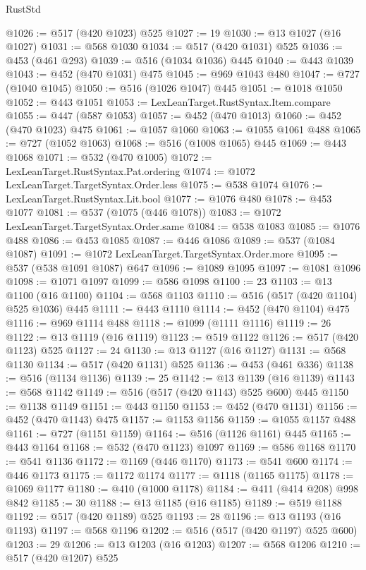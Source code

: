 \begin{lexlean}{RustStd}
\begin{coremodule}
@1026 := @517 (@420 @1023) @525
@1027 := 19
@1030 := @13 @1027 (@16 @1027)
@1031 := @568 @1030
@1034 := @517 (@420 @1031) @525
@1036 := @453 (@461 @293)
@1039 := @516 (@1034 @1036) @445
@1040 := @443 @1039
@1043 := @452 (@470 @1031) @475
@1045 := @969 @1043 @480
@1047 := @727 (@1040 @1045)
@1050 := @516 (@1026 @1047) @445
@1051 := @1018 @1050
@1052 := @443 @1051
@1053 := LexLeanTarget.RustSyntax.Item.compare
@1055 := @447 (@587 @1053)
@1057 := @452 (@470 @1013)
@1060 := @452 (@470 @1023) @475
@1061 := @1057 @1060
@1063 := @1055 @1061 @488
@1065 := @727 (@1052 @1063)
@1068 := @516 (@1008 @1065) @445
@1069 := @443 @1068
@1071 := @532 (@470 @1005)
@1072 := LexLeanTarget.RustSyntax.Pat.ordering
@1074 := @1072 LexLeanTarget.TargetSyntax.Order.less
@1075 := @538 @1074
@1076 := LexLeanTarget.RustSyntax.Lit.bool
@1077 := @1076 @480
@1078 := @453 @1077
@1081 := @537 (@1075 (@446 @1078))
@1083 := @1072 LexLeanTarget.TargetSyntax.Order.same
@1084 := @538 @1083
@1085 := @1076 @488
@1086 := @453 @1085
@1087 := @446 @1086
@1089 := @537 (@1084 @1087)
@1091 := @1072 LexLeanTarget.TargetSyntax.Order.more
@1095 := @537 (@538 @1091 @1087) @647
@1096 := @1089 @1095
@1097 := @1081 @1096
@1098 := @1071 @1097
@1099 := @586 @1098
@1100 := 23
@1103 := @13 @1100 (@16 @1100)
@1104 := @568 @1103
@1110 := @516 (@517 (@420 @1104) @525 @1036) @445
@1111 := @443 @1110
@1114 := @452 (@470 @1104) @475
@1116 := @969 @1114 @488
@1118 := @1099 (@1111 @1116)
@1119 := 26
@1122 := @13 @1119 (@16 @1119)
@1123 := @519 @1122
@1126 := @517 (@420 @1123) @525
@1127 := 24
@1130 := @13 @1127 (@16 @1127)
@1131 := @568 @1130
@1134 := @517 (@420 @1131) @525
@1136 := @453 (@461 @336)
@1138 := @516 (@1134 @1136)
@1139 := 25
@1142 := @13 @1139 (@16 @1139)
@1143 := @568 @1142
@1149 := @516 (@517 (@420 @1143) @525 @600) @445
@1150 := @1138 @1149
@1151 := @443 @1150
@1153 := @452 (@470 @1131)
@1156 := @452 (@470 @1143) @475
@1157 := @1153 @1156
@1159 := @1055 @1157 @488
@1161 := @727 (@1151 @1159)
@1164 := @516 (@1126 @1161) @445
@1165 := @443 @1164
@1168 := @532 (@470 @1123) @1097
@1169 := @586 @1168
@1170 := @541 @1136
@1172 := @1169 (@446 @1170)
@1173 := @541 @600
@1174 := @446 @1173
@1175 := @1172 @1174
@1177 := @1118 (@1165 @1175)
@1178 := @1069 @1177
@1180 := @410 (@1000 @1178)
@1184 := @411 (@414 @208) @998 @842
@1185 := 30
@1188 := @13 @1185 (@16 @1185)
@1189 := @519 @1188
@1192 := @517 (@420 @1189) @525
@1193 := 28
@1196 := @13 @1193 (@16 @1193)
@1197 := @568 @1196
@1202 := @516 (@517 (@420 @1197) @525 @600)
@1203 := 29
@1206 := @13 @1203 (@16 @1203)
@1207 := @568 @1206
@1210 := @517 (@420 @1207) @525

\end{coremodule}
\end{lexlean}

